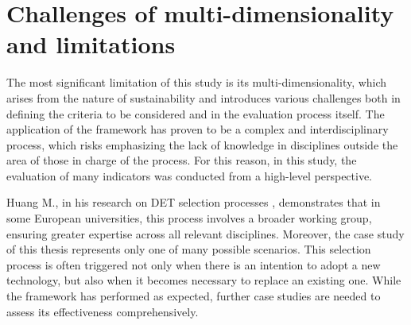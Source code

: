 \section{Challenges of multi-dimensionality and limitations}
The most significant limitation of this study is its multi-dimensionality, which arises from the nature of sustainability and introduces various challenges both in defining the criteria to be considered and in the evaluation process itself. The application of the framework has proven to be a complex and interdisciplinary process, which risks emphasizing the lack of knowledge in disciplines outside the area of those in charge of the process. For this reason, in this study, the evaluation of many indicators was conducted from a high-level perspective.

Huang M., in his research on DET selection processes \cite{huang_building_2023-1}, demonstrates that in some European universities, this process involves a broader working group, ensuring greater expertise across all relevant disciplines.
Moreover, the case study of this thesis represents only one of many possible scenarios. This selection process is often triggered not only when there is an intention to adopt a new technology, but also when it becomes necessary to replace an existing one. While the framework has performed as expected, further case studies are needed to assess its effectiveness comprehensively.
